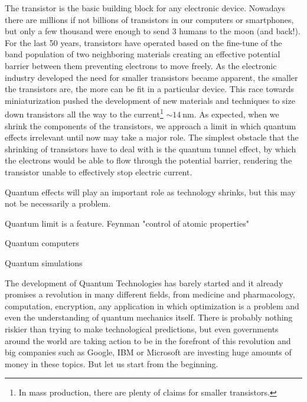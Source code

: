 The transistor is the basic building block for any electronic device. Nowadays there are millions if not billions of transistors in our computers or smartphones, but only a few thousand were enough to send 3 humans to the moon (and back!). For the last 50 years, transistors have operated based on the fine-tune of the band population of two neighboring materials creating an effective potential barrier between them preventing electrons to move freely.
As the electronic industry developed the need for smaller transistors became apparent, the smaller the transistors are, the more can be fit in a particular device.
This race towards miniaturization pushed the development of new materials and techniques to size down transistors all the way to the current\footnote{In mass production, there are plenty of claims for smaller transistors.} $\sim\SI{14}{\nm}$. As expected, when we shrink the components of the transistors, we approach a limit in which quantum effects irrelevant until now may take a major role. The simplest obstacle that the shrinking of transistors have to deal with is the quantum tunnel effect, by which the electrons would be able to flow through the potential barrier, rendering the transistor unable to effectively stop electric current.

Quantum effects will play an important role as technology shrinks, but this may not be necessarily a problem.


\medbreak

Quantum limit is a feature. Feynman "control of atomic properties"

Quantum computers

Quantum simulations






\newpage
The development of Quantum Technologies has barely started and it already promises a revolution in many different fields, from medicine and pharmacology, computation, encryption, any application in which optimization is a problem and even the understanding of quantum mechanics itself.
There is probably nothing riskier than trying to make technological predictions, but even governments around the world are taking action to be in the forefront of this revolution\cite{QTF} and big companies such as Google, IBM or Microsoft are investing huge amounts of money in these topics. But let us start from the beginning.
\medbreak

